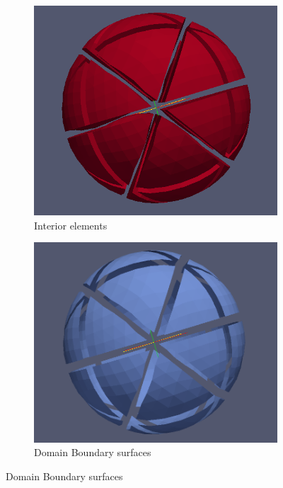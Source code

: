 \begin{figure}
	\begin{subfigure}[b]{0.30\textwidth} \hspace{4mm} \includegraphics[scale=0.22]{images/32-inter} \captionsetup{width=0.8\textwidth} \caption{ Interior elements } \end{subfigure}
	\begin{subfigure}[b]{0.30\textwidth} \hspace{4mm} \includegraphics[scale=0.18]{images/32-db}    \captionsetup{width=0.8\textwidth} \caption{ Domain Boundary surfaces} \end{subfigure}

\end{figure}
